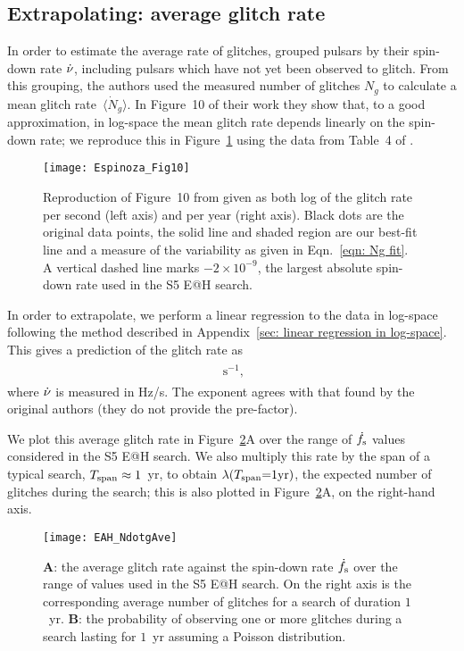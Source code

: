 \documentclass[../full_thesis/full_thesis.tex]{subfiles}
\newcommand{\thisdir}{../glitches_in_CGW}
\begin{document}
\subsection{Extrapolating: average glitch rate}
\label{sec: average glitch frequency}
In order to estimate the average rate of glitches, \citet{Espinoza2011}
grouped pulsars by their spin-down rate $\dot{\nu}$, including pulsars
which have not yet been observed to glitch. From this grouping, the authors
used the measured number of glitches $N_{g}$ to calculate a mean
glitch rate~$\langle \dot{N}_{g}\rangle$. In Figure~10 of their work they
show that, to a good approximation, in log-space the mean glitch rate depends linearly on the spin-down rate;
we reproduce this in Figure~\ref{fig: Espinoza 10} using the data from Table~4
of \citet{Espinoza2011}.
\begin{figure}[htb]
\centering
\texttt{[image: Espinoza\_Fig10]}
\caption{Reproduction of Figure~10 from \citet{Espinoza2011} given as both log of
the glitch rate per second (left axis) and per year (right axis). Black
dots are the original data points, the solid line and shaded region are
our best-fit line and a measure of the variability as given in Eqn.~\eqref{eqn:
Ng fit}. A vertical dashed line marks $-2\times10^{-9}$, the largest absolute
spin-down rate used in the S5 E@H search.}
\label{fig: Espinoza 10}
\end{figure}

In order to extrapolate, we perform a linear regression to the data in
log-space following the method described in Appendix~\ref{sec: linear
regression in log-space}.  This gives a prediction of the glitch rate as
\begin{align}
\begin{split}

\textrm{ s}^{-1},
\end{split}
\label{eqn: Ng fit}
\end{align}
where $\dot{\nu}$ is measured in Hz/s.  The exponent agrees with that found by
the original authors (they do not provide the pre-factor).

We plot this average glitch rate in Figure~\ref{fig: EAH_NdotgAve}A over the
range of $\dot{f}_{\textrm{s}}$ values considered in the S5 E@H search. We also multiply this
rate by the span of a typical search, $T_{\mathrm{span}}\approx1$~yr, to obtain
$\lambda(T_{\mathrm{span}}{=}1\mathrm{yr})$, the expected number of glitches during the search; this is
also plotted in Figure~\ref{fig: EAH_NdotgAve}A, on the right-hand axis.

\begin{figure}[htb]
\centering
\texttt{[image: EAH\_NdotgAve]}
\caption{\textbf{A}: the average glitch rate against the spin-down rate
$\dot{f}_{\textrm{s}}$ over the range of values used in the S5 E@H search. On the right axis is
the corresponding average number of glitches for a search of duration $1$~yr.
\textbf{B}: the probability of observing one or
more glitches during a search lasting for $1$~yr assuming a Poisson distribution.}
\label{fig: EAH_NdotgAve}
\end{figure}
\end{document}
